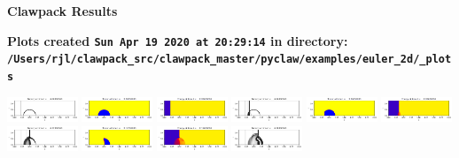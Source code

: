 \documentclass[11pt]{article}
\begin{document}
        \begin{center}{\Large\bf Clawpack Results}\vskip 5pt
        
        \bf Plots created {\tt Sun Apr 19 2020 at 20:29:14} in directory: \vskip 5pt
        \verb+/Users/rjl/clawpack_src/clawpack_master/pyclaw/examples/euler_2d/_plots+
        \end{center}
        \vskip 5pt
        \includegraphics[width=0.15833333333333333\textwidth]{frame0000fig0.png}
\includegraphics[width=0.15833333333333333\textwidth]{frame0000fig1.png}
\includegraphics[width=0.15833333333333333\textwidth]{frame0000fig2.png}
\includegraphics[width=0.15833333333333333\textwidth]{frame0001fig0.png}
\includegraphics[width=0.15833333333333333\textwidth]{frame0001fig1.png}
\includegraphics[width=0.15833333333333333\textwidth]{frame0001fig2.png}
\vskip 10pt 
\includegraphics[width=0.15833333333333333\textwidth]{frame0002fig0.png}
\includegraphics[width=0.15833333333333333\textwidth]{frame0002fig1.png}
\includegraphics[width=0.15833333333333333\textwidth]{frame0002fig2.png}
\includegraphics[width=0.15833333333333333\textwidth]{frame0003fig0.png}
\end{document}

